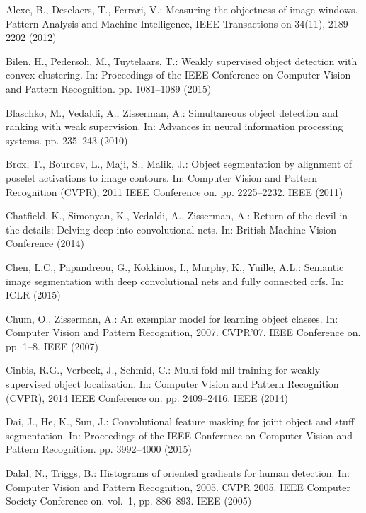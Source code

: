 \documentclass[runningheads]{llncs}
\begin{document}

\begin{thebibliography}{10}


Alexe, B., Deselaers, T., Ferrari, V.: Measuring the objectness of image
  windows. Pattern Analysis and Machine Intelligence, IEEE Transactions on
  34(11),  2189--2202 (2012)

Bilen, H., Pedersoli, M., Tuytelaars, T.: Weakly supervised object detection
  with convex clustering. In: Proceedings of the IEEE Conference on Computer
  Vision and Pattern Recognition. pp. 1081--1089 (2015)

Blaschko, M., Vedaldi, A., Zisserman, A.: Simultaneous object detection and
  ranking with weak supervision. In: Advances in neural information processing
  systems. pp. 235--243 (2010)

Brox, T., Bourdev, L., Maji, S., Malik, J.: Object segmentation by alignment of
  poselet activations to image contours. In: Computer Vision and Pattern
  Recognition (CVPR), 2011 IEEE Conference on. pp. 2225--2232. IEEE (2011)

Chatfield, K., Simonyan, K., Vedaldi, A., Zisserman, A.: Return of the devil in
  the details: Delving deep into convolutional nets. In: British Machine Vision
  Conference (2014)

Chen, L.C., Papandreou, G., Kokkinos, I., Murphy, K., Yuille, A.L.: Semantic
  image segmentation with deep convolutional nets and fully connected crfs. In:
  ICLR (2015)

Chum, O., Zisserman, A.: An exemplar model for learning object classes. In:
  Computer Vision and Pattern Recognition, 2007. CVPR'07. IEEE Conference on.
  pp. 1--8. IEEE (2007)

Cinbis, R.G., Verbeek, J., Schmid, C.: Multi-fold mil training for weakly
  supervised object localization. In: Computer Vision and Pattern Recognition
  (CVPR), 2014 IEEE Conference on. pp. 2409--2416. IEEE (2014)

Dai, J., He, K., Sun, J.: Convolutional feature masking for joint object and
  stuff segmentation. In: Proceedings of the IEEE Conference on Computer Vision
  and Pattern Recognition. pp. 3992--4000 (2015)

Dalal, N., Triggs, B.: Histograms of oriented gradients for human detection.
  In: Computer Vision and Pattern Recognition, 2005. CVPR 2005. IEEE Computer
  Society Conference on. vol.~1, pp. 886--893. IEEE (2005)


\end{thebibliography}
\end{document}

